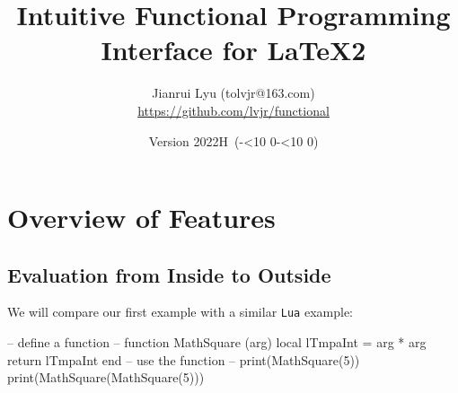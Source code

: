 \documentclass[oneside]{book}
\newcommand*{\myversion}{2022H}
\newcommand*{\mydate}{Version \myversion\ (\the\year-\mylpad\month-\mylpad\day)}
\newcommand*{\mylpad}[1]{\ifnum#1<10 0\the#1\else\the#1\fi}
\begin{document}
\title{\sffamily Intuitive \textcolor{green3}{Functional} Programming Interface for LaTeX2}
\author{Jianrui Lyu (tolvjr@163.com)\\\url{https://github.com/lvjr/functional}}
\date{\mydate\vspace{1cm}\\\myabstract\vspace{10cm}}

\newcommand\myabstract{\parbox{\linewidth}{\hrule\vspace{0.8em}\large
This package provides an intuitive functional programming interface for LaTeX2,
which is an alternative choice to \textsf{expl3} or LuaTeX,
if you want to do programming in LaTeX.
\par\vspace{0.5em}
Although there are functions in LaTeX3 programming layer (\textsf{expl3}),
the evaluation of them is from outside to inside.
With this package, the evaluation of functions is from inside to outside,
which is the same as other programming languages such as \texttt{Lua}.
In this way, it is rather easy to debug code too.
\par\vspace{0.5em}
Note that many paragraphs in this manual are copied from the documentation of \textsf{expl3}.
\par\vspace{0.8em}\hrule}}

{\let\newpage\relax\vspace{-4cm}\maketitle}

\tableofcontents

\chapter{Overview of Features}

\section{Evaluation from Inside to Outside}

We will compare our first example with a similar \verb!Lua! example:

\begin{minipage}{0.55\textwidth}
\begin{codehigh}
\IgnoreSpacesOn
\prgNewFunction {} {
  \intSet {}
  \prgReturn {\expValue \lTmpaInt}
}
\IgnoreSpacesOff
{}
\end{codehigh}
\end{minipage}%
\begin{minipage}{0.45\textwidth}
\begin{code}
-- define a function --
function MathSquare (arg)
  local lTmpaInt = arg * arg
  return lTmpaInt
end
-- use the function --
print(MathSquare(5))
print(MathSquare(MathSquare(5)))
\end{code}
\end{minipage}
\end{document}
